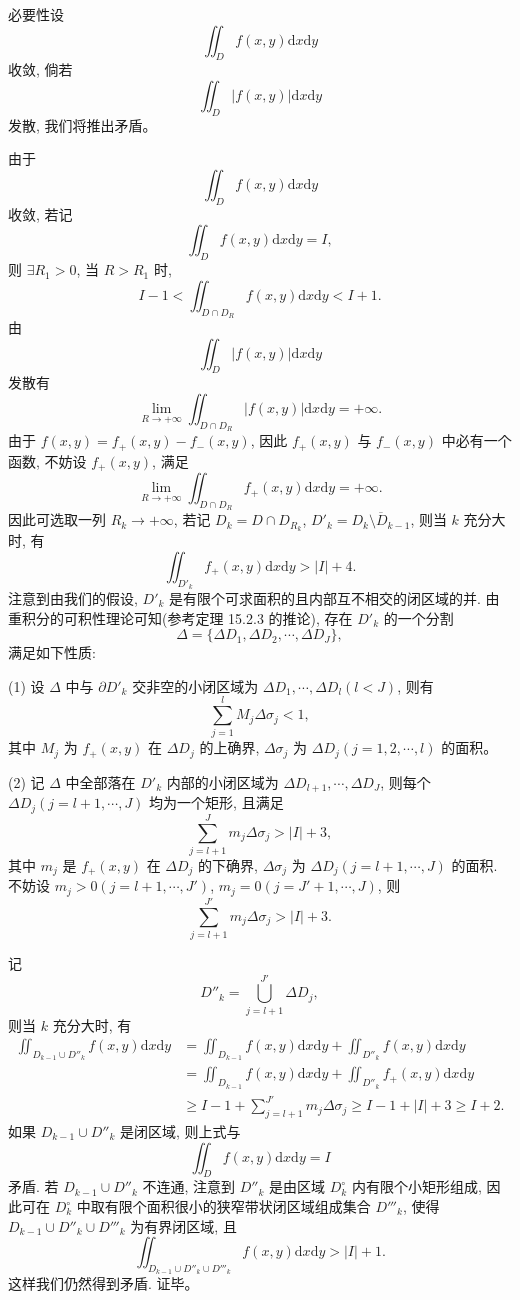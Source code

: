 \documentclass[UTF8, 12pt, fontset=fandol, oneside]{ctexart}
\begin{document}
必要性\quad 设
\[
  \iint_D f(x,y)\mathrm dx\mathrm dy
\]
收敛, 倘若
\[
  \iint_D |f(x,y)|\mathrm dx\mathrm dy
\]
发散, 我们将推出矛盾。

由于
\[
  \iint_D f(x,y)\mathrm dx\mathrm dy
\]
收敛, 若记
\[
  \iint_D f(x,y)\mathrm dx\mathrm dy=I,
\]
则 $\exists R_1>0$, 当 $R>R_1$ 时,
\[
  I-1<\iint_{D\cap D_R}f(x,y)\mathrm dx\mathrm dy<I+1.
\]
由
\[
  \iint_D |f(x,y)|\mathrm dx\mathrm dy
\]
发散有
\[
  \lim_{R\to+\infty}\iint_{D\cap D_R}|f(x,y)|\mathrm dx\mathrm dy=+\infty.
\]
由于 $f(x,y)=f_+(x,y)-f_-(x,y)$, 因此 $f_+(x,y)$ 与 $f_-(x,y)$ 中必有一个函数, 不妨设 $f_+(x,y)$, 满足
\[
  \lim_{R\to+\infty}\iint_{D\cap D_R}f_+(x,y)\mathrm dx\mathrm dy=+\infty.
\]
因此可选取一列 $R_k\to+\infty$, 若记 $D_k=D\cap D_{R_k}$, $D'_k=\overline{D_k\setminus D_{k-1}}$, 则当 $k$ 充分大时, 有
\[
  \iint_{D'_k}f_+(x,y)\mathrm dx\mathrm dy>|I|+4.
\]
注意到由我们的假设, $D'_k$ 是有限个可求面积的且内部互不相交的闭区域的并. 由重积分的可积性理论可知(参考定理 15.2.3 的推论), 存在 $D'_k$ 的一个分割
\[
  \Delta=\{\Delta D_1,\Delta D_2,\cdots,\Delta D_J\},
\]
满足如下性质:

(1) 设 $\Delta$ 中与 $\partial D'_k$ 交非空的小闭区域为 $\Delta D_1,\cdots,\Delta D_l(l<J)$, 则有
\[
  \sum_{j=1}^l M_j\Delta\sigma_j<1,
\]
其中 $M_j$ 为 $f_+(x,y)$ 在 $\Delta D_j$ 的上确界, $\Delta\sigma_j$ 为 $\Delta D_j(j=1,2,\cdots,l)$ 的面积。

(2) 记 $\Delta$ 中全部落在 $D'_k$ 内部的小闭区域为 $\Delta D_{l+1},\cdots,\Delta D_J$, 则每个 $\Delta D_j(j=l+1,\cdots,J)$ 均为一个矩形, 且满足
\[
  \sum_{j=l+1}^J m_j\Delta\sigma_j>|I|+3,
\]
其中 $m_j$ 是 $f_+(x,y)$ 在 $\Delta D_j$ 的下确界, $\Delta\sigma_j$ 为 $\Delta D_j(j=l+1,\cdots,J)$ 的面积. 不妨设 $m_j>0(j=l+1,\cdots,J')$, $m_j=0(j=J'+1,\cdots,J)$, 则
\[
  \sum_{j=l+1}^{J'}m_j\Delta\sigma_j>|I|+3.
\]

记
\[
  D''_k=\bigcup_{j=l+1}^{J'}\Delta D_j,
\]
则当 $k$ 充分大时, 有
\[
\begin{aligned}
  \iint_{D_{k-1}\cup D''_k}f(x,y)\mathrm dx\mathrm dy
  &=\iint_{D_{k-1}}f(x,y)\mathrm dx\mathrm dy
  +\iint_{D''_k}f(x,y)\mathrm dx\mathrm dy\\
  &=\iint_{D_{k-1}}f(x,y)\mathrm dx\mathrm dy
  +\iint_{D''_k}f_+(x,y)\mathrm dx\mathrm dy\\
  &\geqslant I-1+\sum_{j=l+1}^{J'}m_j\Delta\sigma_j
  \geqslant I-1+|I|+3\geqslant I+2.
\end{aligned}
\]
如果 $D_{k-1}\cup D''_k$ 是闭区域, 则上式与
\[
  \iint_D f(x,y)\mathrm dx\mathrm dy=I
\]
矛盾. 若 $D_{k-1}\cup D''_k$ 不连通, 注意到 $D''_k$ 是由区域 $D_k^\circ$ 内有限个小矩形组成, 因此可在 $D_k^\circ$ 中取有限个面积很小的狭窄带状闭区域组成集合 $D'''_k$, 使得 $D_{k-1}\cup D''_k\cup D'''_k$ 为有界闭区域, 且
\[
  \iint_{D_{k-1}\cup D''_k\cup D'''_k}f(x,y)\mathrm dx\mathrm dy>|I|+1.
\]
这样我们仍然得到矛盾. 证毕。
\end{document}
